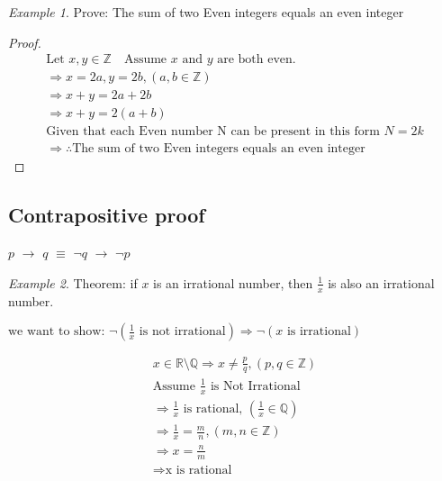 \documentclass[11pt]{report}
\theoremstyle{remark}
\newtheorem*{example}{Example}
\newcommand{\Z}{\mathbb{Z}}
\begin{document}
	\begin{example}
		Prove: The sum of two Even integers equals an even integer\\
		\begin{proof}
			\begin{gather}
				\text{Let }x, y \in \mathbb{Z} \quad \text{Assume $x$ and $y$ are both even.} \\ 
				\Rightarrow x = 2a, y = 2b, (a, b \in \mathbb{Z})
				\\ \Rightarrow x + y = 2a + 2b \\ 
				\Rightarrow x + y = 2(a + b) \\
				\text{Given that each Even number N can be present in this form $N = 2k$}\\
				\Rightarrow \therefore \text{The sum of two Even integers equals an even integer}
			\end{gather}
		\end{proof}
	\end{example}
	
	\subsection{Contrapositive proof}
	\begin{center}
		$p$ $\rightarrow$ $q$ $\equiv$ $\neg q$  $\rightarrow$ $\neg p$\\
	\end{center}
	\begin{example}
		Theorem: if $x$ is an irrational number, then $\frac{1}{x}$ is also an irrational number.
	\end{example}
	$\text{we want to show: }\neg (\frac{1}{x} \text{ is not irrational}) \Rightarrow \neg (x \text{ is irrational}) $

	\begin{gather}
		x \in \mathbb{R} \setminus \mathbb{Q} \Rightarrow x \neq \frac{p}{q}, (p, q \in \mathbb{Z}) \\ 
		\text{Assume } \frac{1}{x} \text{ is Not Irrational}\\
		\Rightarrow \frac{1}{x} \text{ is rational, } (\frac{1}{x} \in \mathbb{Q})\\
		\Rightarrow \frac{1}{x} = \frac{m}{n}, (m, n \in \Z)\\
		\Rightarrow x = \frac{n}{m} \\
		\Rightarrow \text{x is rational}
	\end{gather}
\end{document}
